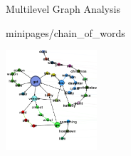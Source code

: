\documentclass[xcolor=x11names,compress]{beamer}
\begin{document}
{
\begin{frame}[t]{Multilevel Graph Analysis}
    \vspace{-0.2cm}
    
     {minipages/chain_of_words}

    \vspace{-0.5cm}
    \begin{minipage}[t]{\textwidth}
        \centering
    \end{minipage}

    \begin{minipage}[t]{\textwidth}
        \hspace{-0.715cm}
        \includegraphics[width=0.25355637513\textwidth]{immagini/arlie_80_lv0}
    \end{minipage}
\end{frame}}
\end{document}
